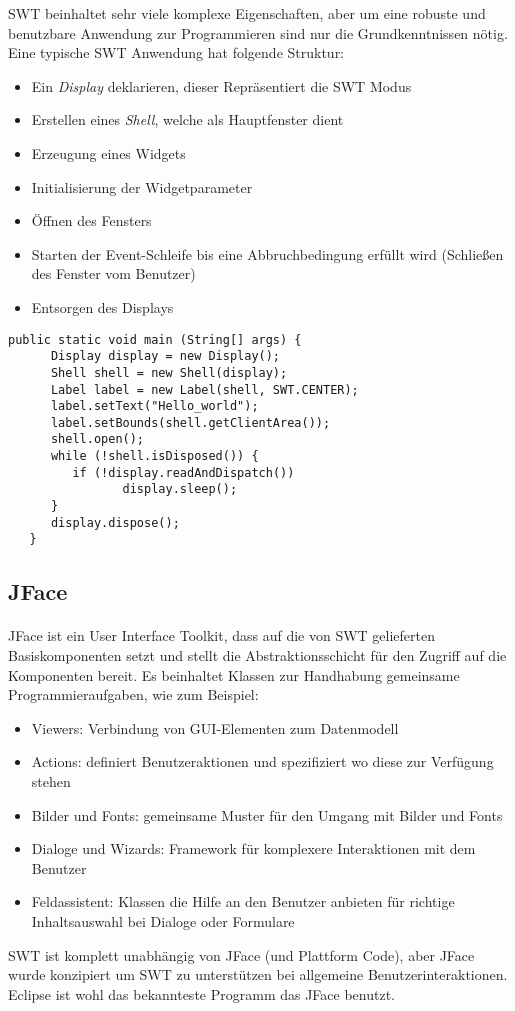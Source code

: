 SWT beinhaltet sehr viele komplexe Eigenschaften, aber um eine robuste und benutzbare Anwendung zur Programmieren sind nur die Grundkenntnissen nötig. Eine typische SWT Anwendung hat folgende Struktur:

\begin{itemize}
\item Ein \textit{Display} deklarieren, dieser Repräsentiert die SWT Modus
\item Erstellen eines \textit{Shell}, welche als Hauptfenster dient
\item Erzeugung eines Widgets
\item Initialisierung der Widgetparameter
\item Öffnen des Fensters
\item Starten der Event-Schleife bis eine Abbruchbedingung erfüllt wird (Schließen des Fenster vom Benutzer)
\item Entsorgen des Displays
\end{itemize}

\begin{lstlisting}[caption={Beispiel einer SWT Anwendung}, captionpos=b]
   public static void main (String[] args) {
      Display display = new Display();
      Shell shell = new Shell(display);
      Label label = new Label(shell, SWT.CENTER);
      label.setText("Hello_world");
      label.setBounds(shell.getClientArea());
      shell.open();
      while (!shell.isDisposed()) {
         if (!display.readAndDispatch())
         		display.sleep();
      }
      display.dispose();
   }
\end{lstlisting}

\subsection{JFace}
\paragraph{}
JFace ist ein User Interface Toolkit, dass auf die von SWT gelieferten Basiskomponenten setzt und stellt die Abstraktionsschicht für den Zugriff auf die Komponenten bereit. Es beinhaltet Klassen zur Handhabung gemeinsame Programmieraufgaben, wie zum Beispiel:


\begin{itemize}
\item Viewers: Verbindung von GUI-Elementen zum Datenmodell
\item Actions: definiert Benutzeraktionen und spezifiziert wo diese zur Verfügung stehen
\item Bilder und Fonts: gemeinsame Muster für den Umgang mit Bilder und Fonts
\item Dialoge und Wizards: Framework für komplexere Interaktionen mit dem Benutzer
\item Feldassistent: Klassen die Hilfe an den Benutzer anbieten für richtige Inhaltsauswahl bei Dialoge oder Formulare
\end{itemize}


SWT ist komplett unabhängig von JFace (und Plattform Code), aber JFace wurde konzipiert um SWT zu unterstützen bei allgemeine Benutzerinteraktionen. Eclipse ist wohl das bekannteste Programm das JFace benutzt.\cite{EclipseHelp}